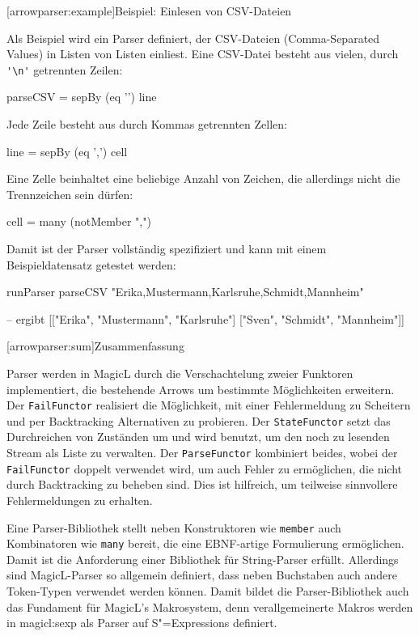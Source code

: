 \documentclass[12pt, a4paper, bibgerm]{scrbook}
\newcommand\icode[1]{\lstinline?#1?}
\newcommand\lsection{}
\newcommand\sref{}
\newcommand{\sexps}{S"=Expressions}
\begin{document}
\lsection[arrowparser:example]{Beispiel: Einlesen von CSV-Dateien}

Als Beispiel wird ein Parser definiert, der CSV-Dateien (Comma-Separated
Values) in Listen von Listen einliest. Eine CSV-Datei besteht aus
vielen, durch \icode{'\n'} getrennten Zeilen:
\begin{code}
parseCSV = sepBy (eq '\n') line
\end{code}
Jede Zeile besteht aus durch Kommas getrennten Zellen:
\begin{code}
line = sepBy (eq ',') cell
\end{code}
Eine Zelle beinhaltet eine beliebige Anzahl von Zeichen, die allerdings
nicht die Trennzeichen sein dürfen:
\begin{code}
cell = many (notMember ",\n")
\end{code}
Damit ist der Parser vollständig spezifiziert und kann mit einem
Beispieldatensatz getestet werden:
\begin{code}
runParser parseCSV "Erika,Mustermann,Karlsruhe\nSven,Schmidt,Mannheim"

-- ergibt [["Erika", "Mustermann", "Karlsruhe"]
           ["Sven",  "Schmidt",    "Mannheim"]]
\end{code}

\lsection[arrowparser:sum]{Zusammenfassung}

Parser werden in MagicL durch die Verschachtelung zweier Funktoren
implementiert, die bestehende Arrows um bestimmte Möglichkeiten
erweitern. Der \icode{FailFunctor} realisiert die Möglichkeit, mit einer
Fehlermeldung zu Scheitern und per Backtracking Alternativen zu
probieren. Der \icode{StateFunctor} setzt das Durchreichen von Zuständen
um und wird benutzt, um den noch zu lesenden Stream als Liste zu
verwalten. Der \icode{ParseFunctor} kombiniert beides, wobei der
\icode{FailFunctor} doppelt verwendet wird, um auch Fehler zu
ermöglichen, die nicht durch Backtracking zu beheben sind. Dies ist
hilfreich, um teilweise sinnvollere Fehlermeldungen zu erhalten.

Eine Parser-Bibliothek stellt neben Konstruktoren wie \icode{member}
auch Kombinatoren wie \icode{many} bereit, die eine EBNF-artige
Formulierung ermöglichen. Damit ist die Anforderung einer Bibliothek
für String-Parser erfüllt. Allerdings sind MagicL-Parser so allgemein
definiert, dass neben Buchstaben auch andere Token-Typen verwendet
werden können. Damit bildet die Parser-Bibliothek auch das Fundament für
MagicL's Makrosystem, denn verallgemeinerte Makros werden in
\sref{magicl:sexp} als Parser auf \sexps{} definiert.
\end{document}
